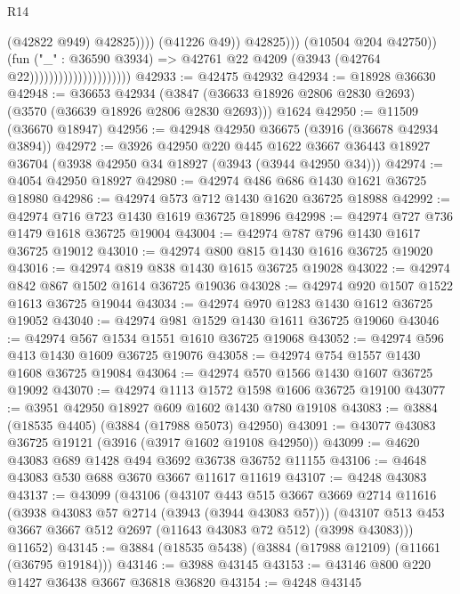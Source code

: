 \begin{lexlean}{R14}
\begin{coremodule}
                                                          (@42822 @949)
                                                          @42825))))
                                                  (@41226 @49))
                                                @42825)))
                                          (@10504 @204 @42750))
                                        (fun ("_" : @36590 @3934) =>
                                        @42761 @22 @4209 (@3943 (@42764 @22)))))))))))))))))))))
@42933 := @42475 @42932
@42934 := @18928 @36630
@42948 := @36653
    @42934
    (@3847 (@36633 @18926 @2806 @2830 @2693) (@3570 (@36639 @18926 @2806 @2830 @2693)))
    @1624
@42950 := @11509 (@36670 @18947)
@42956 := @42948 @42950 @36675 (@3916 (@36678 @42934 @3894))
@42972 := @3926
    @42950
    @220
    @445
    @1622
    @3667
    @36443
    @18927
    @36704
    (@3938 @42950 @34 @18927 (@3943 (@3944 @42950 @34)))
@42974 := @4054 @42950 @18927
@42980 := @42974 @486 @686 @1430 @1621 @36725 @18980
@42986 := @42974 @573 @712 @1430 @1620 @36725 @18988
@42992 := @42974 @716 @723 @1430 @1619 @36725 @18996
@42998 := @42974 @727 @736 @1479 @1618 @36725 @19004
@43004 := @42974 @787 @796 @1430 @1617 @36725 @19012
@43010 := @42974 @800 @815 @1430 @1616 @36725 @19020
@43016 := @42974 @819 @838 @1430 @1615 @36725 @19028
@43022 := @42974 @842 @867 @1502 @1614 @36725 @19036
@43028 := @42974 @920 @1507 @1522 @1613 @36725 @19044
@43034 := @42974 @970 @1283 @1430 @1612 @36725 @19052
@43040 := @42974 @981 @1529 @1430 @1611 @36725 @19060
@43046 := @42974 @567 @1534 @1551 @1610 @36725 @19068
@43052 := @42974 @596 @413 @1430 @1609 @36725 @19076
@43058 := @42974 @754 @1557 @1430 @1608 @36725 @19084
@43064 := @42974 @570 @1566 @1430 @1607 @36725 @19092
@43070 := @42974 @1113 @1572 @1598 @1606 @36725 @19100
@43077 := @3951 @42950 @18927 @609 @1602 @1430 @780 @19108
@43083 := @3884 (@18535 @4405) (@3884 (@17988 @5073) @42950)
@43091 := @43077 @43083 @36725 @19121 (@3916 (@3917 @1602 @19108 @42950))
@43099 := @4620 @43083 @689 @1428 @494 @3692 @36738 @36752 @11155
@43106 := @4648 @43083 @530 @688 @3670 @3667 @11617 @11619
@43107 := @4248 @43083
@43137 := @43099
    (@43106
      (@43107
        @443
        @515
        @3667
        @3669
        @2714
        @11616
        (@3938 @43083 @57 @2714 (@3943 (@3944 @43083 @57)))
        (@43107 @513 @453 @3667 @3667 @512 @2697 (@11643 @43083 @72 @512) (@3998 @43083)))
      @11652)
@43145 := @3884 (@18535 @5438) (@3884 (@17988 @12109) (@11661 (@36795 @19184)))
@43146 := @3988 @43145
@43153 := @43146 @800 @220 @1427 @36438 @3667 @36818 @36820
@43154 := @4248 @43145

\end{coremodule}
\end{lexlean}
